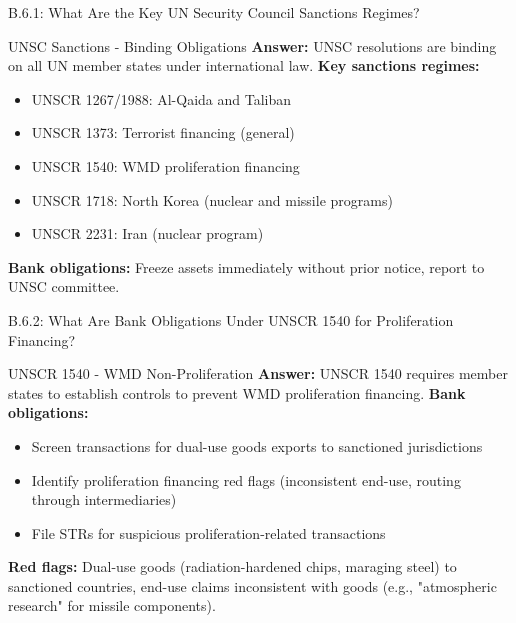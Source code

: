 \documentclass{beamer}
\begin{document}
	\begin{frame}{B.6.1: What Are the Key UN Security Council Sanctions Regimes?}
		\begin{block}{UNSC Sanctions - Binding Obligations}
			\textbf{Answer:} UNSC resolutions are binding on all UN member states under international law.
			\vspace{0.2cm}
			\textbf{Key sanctions regimes:}
			\begin{itemize}
				\item UNSCR 1267/1988: Al-Qaida and Taliban
				\item UNSCR 1373: Terrorist financing (general)
				\item UNSCR 1540: WMD proliferation financing
				\item UNSCR 1718: North Korea (nuclear and missile programs)
				\item UNSCR 2231: Iran (nuclear program)
			\end{itemize}
			\textbf{Bank obligations:} Freeze assets immediately without prior notice, report to UNSC committee.
		\end{block}
	\end{frame}
	
	\begin{frame}{B.6.2: What Are Bank Obligations Under UNSCR 1540 for Proliferation Financing?}
		\begin{block}{UNSCR 1540 - WMD Non-Proliferation}
			\textbf{Answer:} UNSCR 1540 requires member states to establish controls to prevent WMD proliferation financing.
			\vspace{0.2cm}
			\textbf{Bank obligations:}
			\begin{itemize}
				\item Screen transactions for dual-use goods exports to sanctioned jurisdictions
				\item Identify proliferation financing red flags (inconsistent end-use, routing through intermediaries)
				\item File STRs for suspicious proliferation-related transactions
			\end{itemize}
			\textbf{Red flags:} Dual-use goods (radiation-hardened chips, maraging steel) to sanctioned countries, end-use claims inconsistent with goods (e.g., "atmospheric research" for missile components).
		\end{block}
	\end{frame}
	
	
\end{document}
